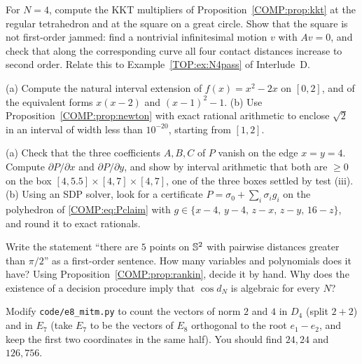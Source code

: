 \begin{exercise}\label{COMP:exc:kkt}
For $N=4$, compute the KKT multipliers of Proposition~\ref{COMP:prop:kkt} at the regular tetrahedron and at the
square on a great circle. Show that the square is not first-order jammed: find a nontrivial infinitesimal motion $v$ with $Av=0$, and
check that along the corresponding curve all four contact distances increase to second order. Relate this to
Example~\ref{TOP:ex:N4pass} of Interlude~D.
\end{exercise}

\begin{exercise}
(a) Compute the natural interval extension of $f(x)=x^2-2x$ on $[0,2]$, and of the equivalent forms $x(x-2)$ and
$(x-1)^2-1$. (b) Use Proposition~\ref{COMP:prop:newton} with exact rational arithmetic to enclose $\sqrt2$ in an
interval of width less than $10^{-20}$, starting from $[1,2]$.
\end{exercise}

\begin{exercise}\label{COMP:exc:sos}
(a) Check that the three coefficients $A,B,C$ of $P$ vanish on the edge $x=y=4$.
Compute $\partial P/\partial x$ and $\partial P/\partial y$, and show by interval arithmetic that both are
$\ge0$ on the box $[4,5.5]\times[4,7]\times[4,7]$, one of the three boxes settled by test (iii). (b) Using an SDP solver,
look for a certificate $P=\sigma_0+\sum_i\sigma_ig_i$ on the polyhedron of \eqref{COMP:eq:Pclaim} with
$g\in\{x-4,\,y-4,\,z-x,\,z-y,\,16-z\}$, and round it to exact rationals.
\end{exercise}

\begin{exercise}
Write the statement ``there are $5$ points on $\mathbb{S}^2$ with pairwise distances greater than $\pi/2$'' as a
first-order sentence. How many variables and polynomials does it have? Using
Proposition~\ref{COMP:prop:rankin}, decide it by hand. Why does the existence of a decision procedure imply that
$\cos d_N$ is algebraic for every $N$?
\end{exercise}

\begin{exercise}
Modify \texttt{code/e8\_mitm.py} to count the vectors of norm $2$ and $4$ in $D_4$ (split $2+2$) and in $E_7$
(take $E_7$ to be the vectors of $E_8$ orthogonal to the root $e_1-e_2$, and keep the first two coordinates in the
same half). You should find $24,24$ and $126,756$.
\end{exercise}

